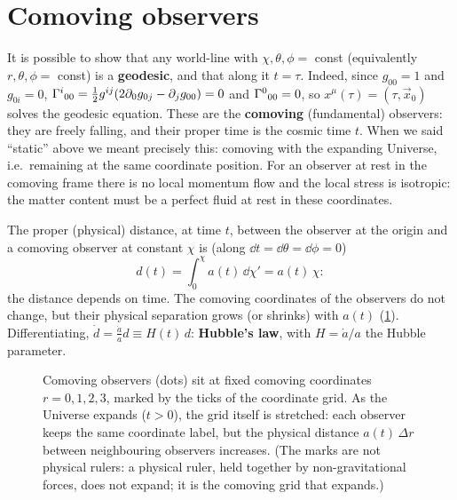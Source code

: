 \section{Comoving observers}

It is possible to show that any world-line with $\chi,\theta,\phi=$ const (equivalently $r,\theta,\phi=$ const) is a \textbf{geodesic}, and that along it $t=\tau$. Indeed, since $g_{00}=1$ and $g_{0i}=0$, $\Gamma^{i}{}_{00}=\frac12g^{ij}(2\partial_0g_{0j}-\partial_jg_{00})=0$ and $\Gamma^{0}{}_{00}=0$, so $x^\mu(\tau)=(\tau,\vec x_0)$ solves the geodesic equation. These are the \textbf{comoving} (fundamental) observers: they are freely falling, and their proper time is the cosmic time $t$. When we said ``static'' above we meant precisely this: comoving with the expanding Universe, i.e.\ remaining at the same coordinate position. For an observer at rest in the comoving frame there is no local momentum flow and the local stress is isotropic: the matter content must be a perfect fluid at rest in these coordinates.

The proper (physical) distance, at time $t$, between the observer at the origin and a comoving observer at constant $\chi$ is (along $\dd t=\dd\theta=\dd\phi=0$)
\[
  d(t)=\int_0^\chi a(t)\,\dd\chi'=a(t)\,\chi :
\]
the distance depends on time. The comoving coordinates of the observers do not change, but their physical separation grows (or shrinks) with $a(t)$ (\cref{fig:comoving}). Differentiating, $\dot d=\frac{\dot a}{a}d\equiv H(t)\,d$: \textbf{Hubble's law}, with $H=\dot a/a$ the Hubble parameter.

\begin{figure}[ht]
\centering
{}
\caption{Comoving observers (dots) sit at fixed comoving coordinates $r=0,1,2,3$, marked by the ticks of the coordinate grid. As the Universe expands ($t>0$), the grid itself is stretched: each observer keeps the same coordinate label, but the physical distance $a(t)\,\Delta r$ between neighbouring observers increases. (The marks are not physical rulers: a physical ruler, held together by non-gravitational forces, does not expand; it is the comoving grid that expands.)}
\label{fig:comoving}
\end{figure}

